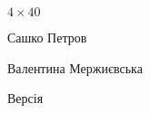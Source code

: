 


\hbox{}\newpage

\ifpdf
\nopagecolor
\else
\pagecolor{white}
\fi


\def\Title{$4\times40$}
\def\SashkoName{Сашко Петров}
\def\SashkoEmail{alexandervpetrov@gmail.com}
\def\ValyaName{Валентина Мержиєвська}
\def\ValyaEmail{yakavoska@gmail.com}

\cleartooddpage
\hbox{}\vfill
\begin{center}
  \vspace*{\OPTtitleskip}
  {\fontsize{\OPTtitletitlefont}{\OPTtitletitlefont}\selectfont%
  \Title}\par
  \vspace*{\OPTtitleskip}
  {\fontsize{\OPTauthorfont}{\OPTauthorfont}\selectfont%
  \SashkoName\par
  \vspace*{\OPTauthorinsideskip}
  \ValyaName\par
  }
  \vspace*{\OPTauthorskip}
  {\fontsize{\OPTversionfont}{\OPTversionfont}\selectfont%
  Версія \Version\par
  \vspace*{\OPTversioninsideskip}
  \Date\par
  }
\end{center}
\vfill\hbox{}
\clearpage


\restoregeometry
